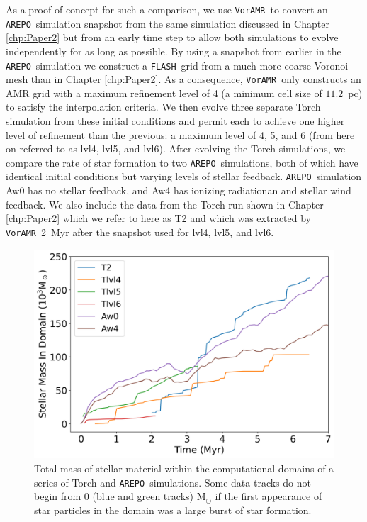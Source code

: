 \documentclass[twoside]{drexel-thesis}
\newcommand\voramr{\texttt{VorAMR}}
\newcommand\flash{\texttt{FLASH}}
\newcommand\arepo{\texttt{AREPO}}
\begin{document}
\begin{thesis}
As a proof of concept for such a comparison, we use \voramr~to convert an \arepo~simulation snapshot from the same simulation discussed in Chapter \ref{chp:Paper2} but from an early time step to allow both simulations to evolve independently for as long as possible. By using a snapshot from earlier in the \arepo~simulation we construct a \flash~grid from a much more coarse Voronoi mesh than in Chapter \ref{chp:Paper2}. As a consequence, \voramr~only constructs an AMR grid with a maximum refinement level of 4 (a minimum cell size of $11.2$~pc) to satisfy the interpolation criteria. We then evolve three separate Torch simulation from these initial conditions and permit each to achieve one higher level of refinement than the previous: a maximum level of 4, 5, and 6 (from here on referred to as lvl4, lvl5, and lvl6). After evolving the Torch simulations, we compare the rate of star formation to two \arepo~simulations, both of which have identical initial conditions but varying levels of stellar feedback. \arepo~simulation Aw0 has no stellar feedback, and Aw4 has ionizing radiationan and stellar wind feedback. We also include the data from the Torch run shown in Chapter \ref{chp:Paper2} which we refer to here as T2 and which was extracted by \voramr~2~Myr after the snapshot used for lvl4, lvl5, and lvl6.

\begin{figure}
    \centering
    \includegraphics[width=\linewidth]{sfr_arepo_comparison.png}
    \caption{Total mass of stellar material within the computational domains of a series of Torch and \arepo~simulations. Some data tracks do not begin from 0 (blue and green tracks) M$_\odot$ if the first appearance of star particles in the domain was a large burst of star formation.}
    \label{fig:sfr_comparison}
\end{figure}


\end{thesis}
\end{document}
